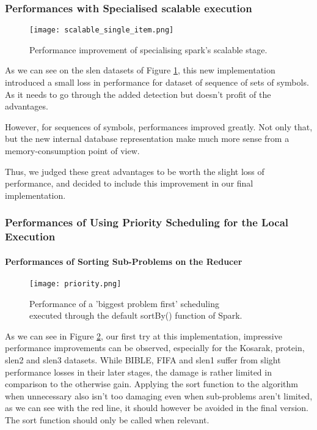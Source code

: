 \documentclass{eplmastersthesis}
\begin{document}
\subsubsection{Performances with Specialised scalable execution}

\begin{figure}[h]
  \centering
  \texttt{[image: scalable\_single\_item.png]}
  \caption{Performance improvement of specialising spark's scalable stage.}
  \label{fig:scalable_single_item}
\end{figure}

As we can see on the slen datasets of Figure \ref{fig:scalable_single_item}, this new implementation introduced a small loss in performance for dataset of sequence of sets of symbols. As it needs to go through the added detection but doesn't profit of the advantages. \newline

However, for sequences of symbols, performances improved greatly. Not only that, but the new internal database representation make much more sense from a memory-consumption point of view. \newline

Thus, we judged these great advantages to be worth the slight loss of performance, and decided to include this improvement in our final implementation.

\subsubsection{Performances of Using Priority Scheduling for the Local Execution}

\paragraph{Performances of Sorting Sub-Problems on the Reducer}

\begin{figure}[h]
  \centering
  \texttt{[image: priority.png]}
  \caption[Naive priority scheduling]{
  		Performance of a 'biggest problem first' scheduling \\
  		executed through the default sortBy() function of Spark.
  	\endtabular
  }
  \label{fig:priority_scheduling_performance_comparison}
\end{figure}

As we can see in Figure \ref{fig:priority_scheduling_performance_comparison}, our first try at this implementation, impressive performance improvements can be observed, especially for the Kosarak, protein, slen2 and slen3 datasets. While BIBLE, FIFA and slen1 suffer from slight performance losses in their later stages, the damage is rather limited in comparison to the otherwise gain. Applying the sort function to the algorithm when unnecessary also isn't too damaging even when sub-problems aren't limited, as we can see with the red line, it should however be avoided in the final version. The sort function should only be called when relevant.\newline
\end{document}
